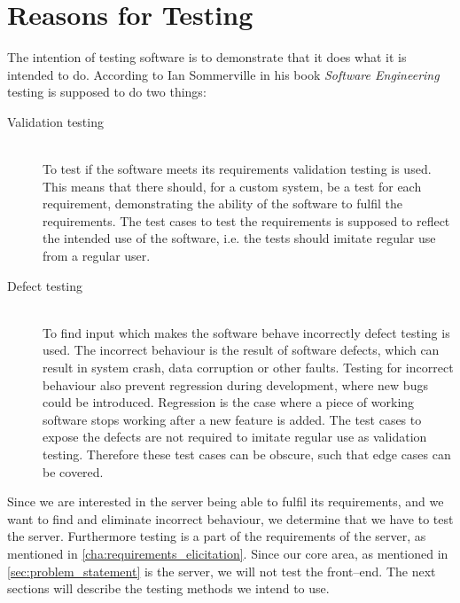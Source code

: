 \section{Reasons for Testing}
The intention of testing software is to demonstrate that it does what it is intended to do.
According to Ian Sommerville in his book \textit{Software Engineering}\cite[p.~227]{software_engineering} testing is supposed to do two things:

\begin{description}
    \item[Validation testing]\cite[p.~227]{software_engineering} \hfill\\
    To test if the software meets its requirements validation testing is used.
    This means that there should, for a custom system, be a test for each requirement,
    demonstrating the ability of the software to fulfil the requirements.
    The test cases to test the requirements is supposed to reflect the intended use of the software,
    i.e. the tests should imitate regular use from a regular user.

    \item[Defect testing]\cite[p.~227]{software_engineering} \hfill\\
    To find input which makes the software behave incorrectly defect testing is used.
    The incorrect behaviour is the result of software defects,
    which can result in system crash, data corruption or other faults.
    Testing for incorrect behaviour also prevent regression during development,
    where new bugs could be introduced.
    Regression is the case where a piece of working software stops working after a new feature is added\cite{regression}.
    The test cases to expose the defects are not required to imitate regular use as validation testing.
    Therefore these test cases can be obscure, such that edge cases can be covered.
\end{description}

Since we are interested in the server being able to fulfil its requirements,
and we want to find and eliminate incorrect behaviour, we determine that we have to test the server.
Furthermore testing is a part of the requirements of the server, as mentioned in \cref{cha:requirements_elicitation}.
Since our core area, as mentioned in \cref{sec:problem_statement} is the server, we will not test the front--end.
The next sections will describe the testing methods we intend to use.

